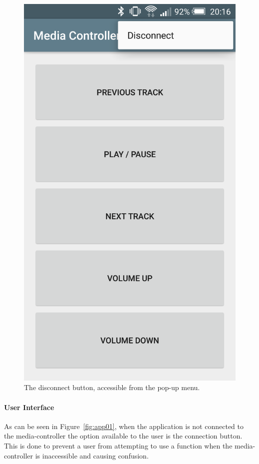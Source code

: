 \documentclass{article}
\begin{document}
\begin{figure}[]
\begin{minipage}[h]{0.29\textwidth}
					\includegraphics[width=\textwidth]{app06}
					\caption{The disconnect button, accessible from the pop-up menu.}
					\label{fig:app06}
				\end{minipage}				
			\end{figure}
			
			\paragraph{User Interface}
			As can be seen in Figure~\ref{fig:app01}, when the application is not connected to the media-controller the option available to the user is the connection button. This is done to prevent a user from attempting to use a function when the media-controller is inaccessible and causing confusion.\\
					
\end{document}

